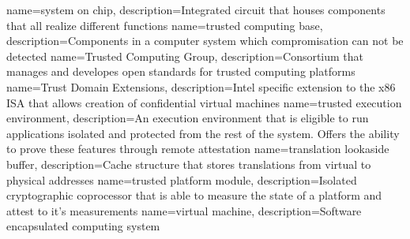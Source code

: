 {
  name=system on chip,
  description={Integrated circuit that houses components that all realize different functions}
}
%
{
  name=trusted computing base,
  description={Components in a computer system which compromisation can not be detected}
}
{
  name=Trusted Computing Group,
  description={Consortium that manages and developes open standards for trusted computing platforms}
}
{
  name=Trust Domain Extensions,
  description={Intel specific extension to the x86 ISA that allows creation of confidential virtual machines}
}
{
  name=trusted execution environment,
  description={An execution environment that is eligible to run applications isolated and protected from the rest of
  the system. Offers the ability to prove these features through remote attestation}
}
{
  name=translation lookaside buffer,
  description={Cache structure that stores translations from virtual to physical addresses}
}
{
  name=trusted platform module,
  description={Isolated cryptographic coprocessor that is able to measure the state of a platform and attest to it's measurements}
}
%
{
  name=virtual machine,
  description={Software encapsulated computing system}
}

